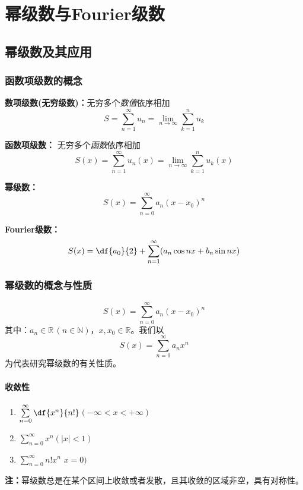 \setcounter{chapter}{12}

\chapter{幂级数与Fourier级数}

\section{幂级数及其应用}

\subsection{函数项级数的概念}

{\bf 数项级数(无穷级数)：}无穷多个{\it 数值}依序相加
$$S=\sum\limits_{n=1}^{\infty}u_n
=\lim\limits_{n\to\infty}\sum\limits_{k=1}^nu_k$$ 

{\bf 函数项级数：} 无穷多个{\it 函数}依序相加 
$$S(x)=\sum\limits_{n=1}^{\infty}u_n(x)
=\lim\limits_{n\to\infty}\sum\limits_{k=1}^nu_k(x)$$

{\bf 幂级数：} 
$$S(x)=\sum\limits_{n=0}^{\infty}a_n(x-x_0)^n$$ 

{\bf Fourier级数：} 
$$S(x)=\df{a_0}{2}+\sum\limits_{n=1}^{\infty}
(a_n\cos nx+b_n\sin nx)$$

\subsection{幂级数的概念与性质}

$${S(x)=\sum\limits_{n=0}^{\infty}a_n(x-x_0)^n}$$
其中：$a_n\in\mathbb{R}\,(n\in\mathbb{N})$，$x,x_0\in\mathbb{R}$。我们以
$${S(x)=\sum\limits_{n=0}^{\infty}a_nx^n}$$
为代表研究幂级数的有关性质。

\subsubsection{收敛性}

\begin{enumerate}[(1)]
  \setlength{\itemindent}{1cm}
  \item $\sum\limits_{n=0}^{\infty}\df{x^n}{n!}$\hfill $(-\infty<x<+\infty)$
  \item $\sum\limits_{n=0}^{\infty}x^n$\hfill $(|x|<1)$
  \item $\sum\limits_{n=0}^{\infty}n!x^n$ \hfill $x=0)$
\end{enumerate}

{\bf 注：}幂级数总是在某个区间上收敛或者发散，且其收敛的区域非空，具有对称性。

